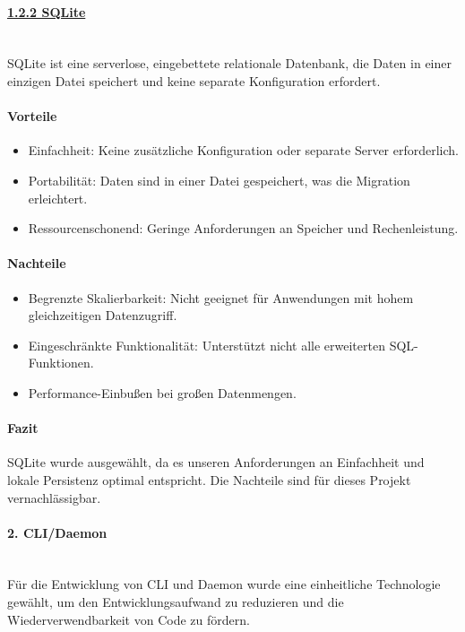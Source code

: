 \documentclass[a4paper,12pt]{report}
\begin{document}
    \paragraph{\underline{1.2.2 SQLite}}\mbox{}\\
    SQLite ist eine serverlose, eingebettete relationale Datenbank, die Daten in einer einzigen Datei speichert und keine separate Konfiguration erfordert.

    \paragraph{Vorteile}
    \begin{itemize}
        \item Einfachheit: Keine zusätzliche Konfiguration oder separate Server erforderlich.
        \item Portabilität: Daten sind in einer Datei gespeichert, was die Migration erleichtert.
        \item Ressourcenschonend: Geringe Anforderungen an Speicher und Rechenleistung.
    \end{itemize}

    \paragraph{Nachteile}
    \begin{itemize}
        \item Begrenzte Skalierbarkeit: Nicht geeignet für Anwendungen mit hohem gleichzeitigen Datenzugriff.
        \item Eingeschränkte Funktionalität: Unterstützt nicht alle erweiterten SQL-Funktionen.
        \item Performance-Einbußen bei großen Datenmengen.
    \end{itemize}

    \paragraph{Fazit}
    SQLite wurde ausgewählt, da es unseren Anforderungen an Einfachheit und lokale Persistenz optimal entspricht.
    Die Nachteile sind für dieses Projekt vernachlässigbar.

    \paragraph{2. CLI/Daemon}\mbox{}\\
    Für die Entwicklung von CLI und Daemon wurde eine einheitliche Technologie gewählt, um den Entwicklungsaufwand zu reduzieren und die Wiederverwendbarkeit von Code zu fördern.
\end{document}
